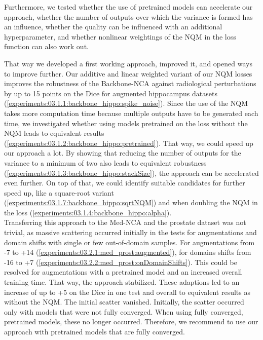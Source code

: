 Furthermore, we tested whether the use of pretrained models can accelerate our approach, whether the number of outputs over which the variance is formed has an influence, whether the quality can be influenced with an additional hyperparameter, and whether nonlinear weightings of the NQM in the loss function can also work out.

That way we developed a first working approach, improved it, and opened ways to improve further. Our additive and linear weighted variant of our NQM losses improves the robustness of the Backbone-NCA against radiological perturbations by up to 15 points on the Dice for augmented hippocampus datasets (\autoref{experiments:03.1.1:backbone_hippo:spike_noise}). Since the use of the NQM takes more computation time because multiple outputs have to be generated each time, we investigated whether using models pretrained on the loss without the NQM leads to equivalent results (\autoref{experiments:03.1.2:backbone_hippo:pretrained}). That way, we could speed up our approach a lot.
By showing that reducing the number of outputs for the variance to a minimum of two also leads to equivalent robustness (\autoref{experiments:03.1.3:backbone_hippo:stackSize}), the approach can be accelerated even further. On top of that, we could identify suitable candidates for further speed up, like a square-root variant (\autoref{experiments:03.1.7:backbone_hippo:sqrtNQM}) and when doubling the NQM in the loss (\autoref{experiments:03.1.4:backbone_hippo:alpha}).\\
Transferring this approach to the Med-NCA and the prostate dataset was not trivial, as massive scattering occurred initially in the tests for augmentations and domain shifts with single or few out-of-domain samples. For augmentations from -7 to +14 (\autoref{experiments:03.2.1:med_prost:augmented}), for domains shifts from -16 to +7 (\autoref{experiments:03.2.2:med_prost:onDomainShifts}). This could be resolved for augmentations with a pretrained model and an increased overall training time. That way, the approach stabilized. These adaptions led to an increase of up to +5 on the Dice in one test and overall to equivalent results as without the NQM. The initial scatter vanished. Initially, the scatter occurred only with models that were not fully converged. When using fully converged, pretrained models, these no longer occurred. Therefore, we recommend to use our approach with pretrained models that are fully converged.
